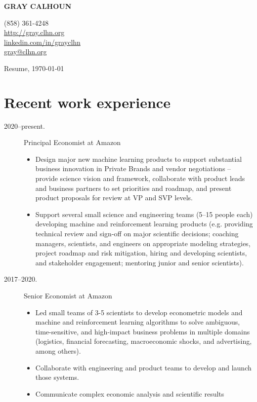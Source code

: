 \documentclass[10pt]{safecv}%
\begin{document}
\MakeUppercase{\textbf{Gray Calhoun}}
\hfill
\parbox[t][0pt]{5cm}{%
\hfill (858) 361-4248 \\
\hfill \url{http://gray.clhn.org}\\
\hfill \href{https://www.linkedin.com/in/grayclhn}{linkedin.com/in/grayclhn} \\
\hfill \url{gray@clhn.org}
}

\vspace{\itemsep}%
Resume, \today

\section*{Recent work experience}

\begin{description}
\item[2020--present.] Principal Economist at Amazon
  \begin{itemize}
  \item Design major new machine learning products to support
    substantial business innovation in Private Brands and vendor
    negotiations -- provide science vision and framework, collaborate
    with product leads and business partners to set priorities and
    roadmap, and present product proposals for review at VP and SVP
    levels.
  \item Support several small science and engineering teams (5--15
    people each) developing machine and reinforcement learning
    products (e.g. providing technical review and sign-off on major
    scientific decisions; coaching managers, scientists, and engineers
    on appropriate modeling strategies, project roadmap and risk
    mitigation, hiring and developing scientists, and stakeholder
    engagement; mentoring junior and senior scientists).
  \end{itemize}
\item[2017--2020.] Senior Economist at Amazon
  \begin{itemize}
  \item Led small teams of 3-5 scientists to develop econometric
    models and machine and reinforcement learning algorithms to solve
    ambiguous, time-sensitive, and high-impact business problems in
    multiple domains (logistics, financial forecasting, macroeconomic
    shocks, and advertising, among others).
  \item Collaborate with engineering and product teams to develop and
    launch those systems.
  \item Communicate complex economic analysis and scientific results

\end{itemize}
\end{description}
\end{document}
